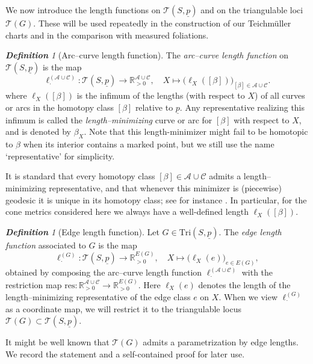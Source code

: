 \documentclass[11pt, letterpaper]{amsart}
\theoremstyle{definition}
\theoremstyle{remark}
\newtheorem{definition}[theorem]{\rm\bf Definition}
\newcommand{\up}{\underline{p}}
\newcommand{\Sp}{(S,\up)}
\newcommand{\TSp}{\text{Tri}\Sp}
\newcommand{\lAC}{\ell^{(\cAC)}}
\newcommand{\cC}{\mathcal{C}}
\newcommand{\cA}{\mathcal{A}}
\newcommand{\cAC}{\mathcal{A} \cup \mathcal{C}}
\newcommand{\cT}{\mathcal{T}}
\newcommand{\cTp}{\mathcal{T} (S,\up)}
\newcommand{\bR}{\mathbb{R}}
\newcommand{\DEF}{} \newcommand{\WARN}{\textcolor{red}} \newcommand{\ALT}{\textcolor{brown}} \newcommand{\TODO}{\textcolor{teal}} %
\numberwithin{equation}{section}
\begin{document}
We now introduce the length functions on \(\cT(S,\underline p)\) and on the triangulable loci \(\cT(G)\). These will be used repeatedly in the construction of our Teichm\"uller charts and in the comparison with measured foliations.

\begin{definition}[Arc--curve length function]
\label{def:arc.curve.leng.Teich.}
The \DEF{\em arc--curve length function} on \(\cT(S,\underline p)\) is the map
\begin{equation}\label{eq:edge.length.Teich}
\lAC_{\cdot}: \cTp \to \bR^{\cA\cup\cC}_{>0},\quad
X \mapsto \bigl(\ell_X([\beta])\bigr)_{[\beta]\in\cAC}.
\end{equation}
where \(\ell_X([\beta])\) is the infimum of the lengths (with respect to \(X\)) of all curves or arcs in the homotopy class \([\beta]\) relative to \(\underline p\).
Any representative realizing this infimum is called the \DEF{\em length–minimizing} curve or arc for \([\beta]\) with respect to \(X\), and is denoted by \(\beta_X\). 
Note that this length-minimizer might fail to be homotopic to $\beta$ when its interior contains a marked point, but we still use the name `representative' for simplicity. 
\end{definition}

It is standard that every homotopy class \([\beta]\in\cAC\) admits a length–minimizing representative, and that whenever this minimizer is (piecewise) geodesic it is unique in its homotopy class; see for instance \cite[Lem.~7.3]{Mon10}. In particular, for the cone metrics considered here we always have a well-defined length \(\ell_X([\beta])\).

\begin{definition}[Edge length function]
\label{def:edge.leng.Teich.}
Let \(G\in\TSp\).
The \DEF{\em edge length function} associated to \(G\) is the map
\[
\ell^{(G)}_{\cdot} : \cT(S,\underline p) \to \bR^{E(G)}_{>0},\quad
X \mapsto \bigl(\ell_X(e)\bigr)_{e\in E(G)},
\]
obtained by composing the arc--curve length function \(\ell^{(\cAC)}_{\cdot}\) with the restriction map
\(\mathrm{res} : \bR^{\cAC}_{>0}\to\bR^{E(G)}_{>0}\).
Here \(\ell_X(e)\) denotes the length of the length–minimizing representative of the edge class \(e\) on \(X\).
When we view \(\ell^{(G)}_{\cdot}\) as a coordinate map, we will restrict it to the triangulable locus \(\cT(G)\subset\cT(S,\underline p)\).
\end{definition}

It might be well known that $\cT(G)$ admits a parametrization by edge lengths.
We record the statement and a self-contained proof for later use.
\end{document}
